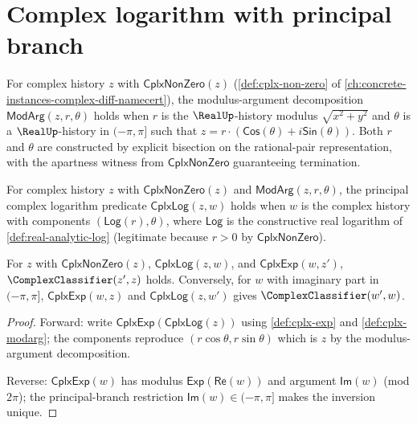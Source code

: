 \section{Complex logarithm with principal branch}
\label{sec:cplx-analytic-log}

\begin{definition}
\label{def:cplx-modarg}
For complex history \(z\) with \(\mathsf{CplxNonZero}(z)\) (\autoref{def:cplx-non-zero} of \autoref{ch:concrete-instances-complex-diff-namecert}), the modulus-argument decomposition \(\mathsf{ModArg}(z, r, \theta)\) holds when \(r\) is the \(\RealUp\)-history modulus \(\sqrt{x^2 + y^2}\) and \(\theta\) is a \(\RealUp\)-history in \((-\pi, \pi]\) such that \(z = r \cdot (\mathsf{Cos}(\theta) + i \mathsf{Sin}(\theta))\). Both \(r\) and \(\theta\) are constructed by explicit bisection on the rational-pair representation, with the apartness witness from \(\mathsf{CplxNonZero}\) guaranteeing termination.
\end{definition}

\begin{definition}
\label{def:cplx-log}
For complex history \(z\) with \(\mathsf{CplxNonZero}(z)\) and \(\mathsf{ModArg}(z, r, \theta)\), the principal complex logarithm predicate \(\mathsf{CplxLog}(z, w)\) holds when \(w\) is the complex history with components \((\mathsf{Log}(r), \theta)\), where \(\mathsf{Log}\) is the constructive real logarithm of \autoref{def:real-analytic-log} (legitimate because \(r > 0\) by \(\mathsf{CplxNonZero}\)).
\end{definition}

\begin{theorem}
\label{thm:cplx-log-exp-inverse}
For \(z\) with \(\mathsf{CplxNonZero}(z)\), \(\mathsf{CplxLog}(z, w)\), and \(\mathsf{CplxExp}(w, z')\), \(\ComplexClassifier(z', z)\) holds. Conversely, for \(w\) with imaginary part in \((-\pi, \pi]\), \(\mathsf{CplxExp}(w, z)\) and \(\mathsf{CplxLog}(z, w')\) gives \(\ComplexClassifier(w', w)\).
\end{theorem}
\begin{proof}
Forward: write \(\mathsf{CplxExp}(\mathsf{CplxLog}(z))\) using \autoref{def:cplx-exp} and \autoref{def:cplx-modarg}; the components reproduce \((r \cos\theta, r \sin\theta)\) which is \(z\) by the modulus-argument decomposition.

Reverse: \(\mathsf{CplxExp}(w)\) has modulus \(\mathsf{Exp}(\mathsf{Re}(w))\) and argument \(\mathsf{Im}(w)\) (mod \(2\pi\)); the principal-branch restriction \(\mathsf{Im}(w) \in (-\pi, \pi]\) makes the inversion unique.
\end{proof}

